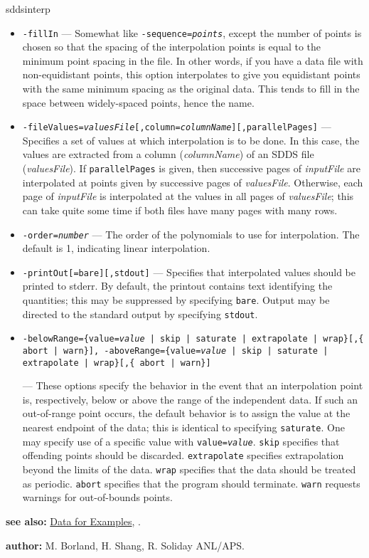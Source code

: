 \begin{sddsprog}{sddsinterp}
\begin{itemize}
      \item \verb|-fillIn| --- Somewhat like {\tt -sequence={\em points}}, except the number of points is chosen so that the spacing of the interpolation points is equal to the minimum point spacing in the file. In other words, if you have a data file with non-equidistant points, this option interpolates to give you equidistant points with the same minimum spacing as the original data. This tends to fill in the space between widely-spaced points, hence the name.
      \item {\tt -fileValues={\em valuesFile}[,column={\em columnName}][,parallelPages]} --- Specifies a set of values at which interpolation is to be done. In this case, the values are extracted from a column ({\em columnName}) of an SDDS file ({\em valuesFile}). If {\tt parallelPages} is given, then successive pages of {\em inputFile} are interpolated at points given by successive pages of {\em valuesFile}. Otherwise, each page of {\em inputFile} is interpolated at the values in all pages of {\em valuesFile}; this can take quite some time if both files have many pages with many rows.
      \item {\tt -order={\em number}} --- The order of the polynomials to use for interpolation. The default is 1, indicating linear interpolation.
      \item {\tt -printOut[=bare][,stdout]} --- Specifies that interpolated values should be printed to stderr. By default, the printout contains text identifying the quantities; this may be suppressed by specifying {\tt bare}. Output may be directed to the standard output by specifying {\tt stdout}.
      \item \begin{raggedright}{\tt -belowRange=\{value={\em value} | skip | saturate | extrapolate | wrap\}[,\{ abort | warn\}], -aboveRange=\{value={\em value} | skip | saturate | extrapolate | wrap\}[,\{ abort | warn\}] }\end{raggedright} --- These options specify the behavior in the event that an interpolation point is, respectively, below or above the range of the independent data. If such an out-of-range point occurs, the default behavior is to assign the value at the nearest endpoint of the data; this is identical to specifying {\tt saturate}. One may specify use of a specific value with {\tt value={\em value}}. {\tt skip} specifies that offending points should be discarded. {\tt extrapolate} specifies extrapolation beyond the limits of the data. {\tt wrap} specifies that the data should be treated as periodic. {\tt abort} specifies that the program should terminate. {\tt warn} requests warnings for out-of-bounds points.
    \end{itemize}
  \item \textbf{see also:} \hyperref[exampleData]{Data for Examples}, .
  \item \textbf{author:} M. Borland, H. Shang, R. Soliday ANL/APS.
\end{sddsprog}
